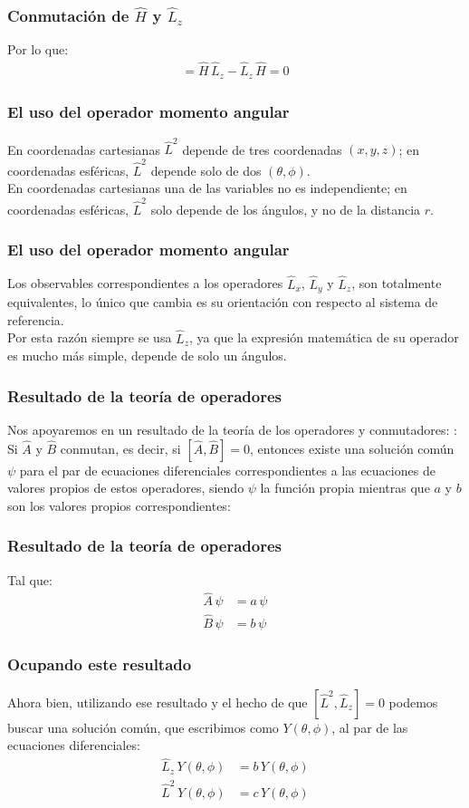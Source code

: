 \begin{frame}
\frametitle{Conmutación de $\hat{H}$ y $\hat{L}_{z}$}
Por lo que:
\begin{align*}
[\hat{H}, \hat{L}_{z}] = \hat{H} \, \hat{L}_{z} - \hat{L}_{z} \, \hat{H} = 0
\end{align*}
\end{frame}
\begin{frame}
\frametitle{El uso del operador momento angular}
En coordenadas cartesianas $\hat{L}^{2}$ depende de tres coordenadas $(x, y, z)$; en coordenadas esféricas, $\hat{L}^{2}$ depende solo de dos $(\theta, \phi)$.
\\
\bigskip
\pause
En coordenadas cartesianas una de las variables no es independiente; en coordenadas esféricas, $\hat{L}^{2}$ solo depende de los ángulos, y no de la distancia $r$.
\end{frame}
\begin{frame}
\frametitle{El uso del operador momento angular}
Los observables correspondientes a los operadores $\hat{L}_{x}$, $\hat{L}_{y}$ y $\hat{L}_{z}$, son totalmente equivalentes, lo único que cambia es su orientación con respecto al sistema de referencia.
\\
\bigskip
\pause
Por esta razón siempre se usa $\hat{L}_{z}$, ya que la expresión matemática de su operador es mucho más simple, depende de solo un ángulos.
\end{frame}
\begin{frame}
\frametitle{Resultado de la teoría de operadores}
Nos apoyaremos en un resultado de la teoría de los operadores y conmutadores: : Si $\hat{A}$ y $\hat{B}$ conmutan, es decir, si  $[\hat{A}, \hat{B}] = 0$, entonces existe una solución común $\psi$  para el par de ecuaciones diferenciales correspondientes a las ecuaciones de valores propios de estos operadores, siendo $\psi$ la función propia mientras que $a$ y $b$ son los valores propios correspondientes:
\end{frame}
\begin{frame}
\frametitle{Resultado de la teoría de operadores}
Tal que:
\begin{align*}
\hat{A} \, \psi &= a \, \psi \\[0.5em]
\hat{B} \, \psi &= b \, \psi
\end{align*}
\end{frame}
\begin{frame}
\frametitle{Ocupando este resultado}
Ahora bien, utilizando ese resultado y el hecho de que $[\hat{L}^{2}, \hat{L}_{z}] = 0$ podemos buscar una solución común, que escribimos como $Y(\theta, \phi)$, al par de las ecuaciones diferenciales:
\begin{align*}
\hat{L}_{z} \, Y(\theta, \phi) &= b \, Y(\theta, \phi) \\[0.5em]
\hat{L}^{2} \, Y(\theta, \phi) &= c \, Y(\theta, \phi)
\end{align*}
\end{frame}
